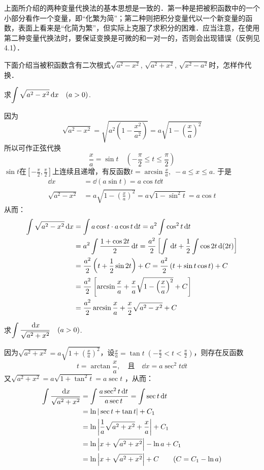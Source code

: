 上面所介绍的两种变量代换法的基本思想是一致的．第一种是把被积函数中的一个小部分看作一个变量，即“化繁为简”；第二种则把积分变量代以一个新变量的函数，表面上看来是“化简为繁”，但实际上克服了求积分的困难．应当注意，在使用第二种变量代换法时，要保证变换是可微的和一对一的，否则会出现错误（反例见4.1）．

下面介绍当被积函数含有二次根式$\sqrt{a^2-x^2}$, $\sqrt{a^2+x^2}$, $\sqrt{x^2-a^2}$时，怎样作代换．

\begin{example}
    求$\displaystyle\int \sqrt{a^2-x^2}\,{\rm d} x\quad (a>0)$.
\end{example}

\begin{solution}
因为\[\sqrt{a^2-x^2}=\sqrt{a^2\left(1-\frac{x^2}{a^2}\right)}=a\sqrt{1-\left(\frac{x}{a}\right)^2}\]
所以可作正弦代换
\[\frac{x}{a}=\sin t\quad \left(-\frac{\pi}{2}\le t\le \frac{\pi}{2}\right)\]
$\sin t$在$\left[-\frac{\pi}{2},\frac{\pi}{2}\right]$上连续且递增，有反函数$t=\arcsin\frac{x}{a},\; -a\le x\le a$. 于是
\[\begin{split}
    \dd x&=\dd (a\sin t)=a\cos t\dd t\\
    \sqrt{a^2-x^2}&=a\sqrt{1-\left(\frac{x}{a}\right)^2}=a\sqrt{1-\sin^2 t}=a\cos t
\end{split}\]
从而：
\[\begin{split}
    \displaystyle\int \sqrt{a^2-x^2}\,{\rm d} x&=\int a\cos t\cdot a\cos t\,{\rm d} t=a^2\int \cos^2 t\,{\rm d} t\\ 
&=a^2\int \dfrac{1+\cos 2t}{2}\,{\rm d} t=\dfrac{a^2}{2}\left[\int \,{\rm d} t+\dfrac{1}{2}\int \cos 2t\,{\rm d} (2t)\right]\\
&=\dfrac{a^2}{2}\left(t+\dfrac{1}{2}\sin 2t\right)+C=\dfrac{a^2}{2}\left(t+\sin t\cos t\right)+C\\
&=\dfrac{a^2}{2}\left[\arcsin\dfrac{x}{a}+\dfrac{x}{a}\sqrt{1-\left(\dfrac{x}{a}\right)^2}+C\right]\\
&=\dfrac{a^2}{2}\arcsin\dfrac{x}{a}+\dfrac{x}{2}\sqrt{a^2-x^2}+C
\end{split}\]
\end{solution}

\begin{example}
    求$\displaystyle\int \dfrac{\,{\rm d} x}{\sqrt{a^2+x^2}}\quad (a>0)$.
\end{example}

\begin{solution}
因为$\sqrt{a^2+x^2}=a\sqrt{1+\left(\frac{x}{a}\right)^2}$，设$\frac{x}{a}=\tan t\; \left(-\frac{\pi}{2}<t<\frac{\pi}{2}\right)$，则存在反函数
\[t=\arctan\frac{x}{a},\quad \text{且}\quad \dd x=a\sec^2 t\dd t\]
又$\sqrt{a^2+x^2}=a\sqrt{1+\tan^2 t}=a\sec t$
，从而：
\[\begin{split}
    \displaystyle\int \dfrac{\,{\rm d} x}{\sqrt{a^2+x^2}}&=\int\dfrac{a\sec^2 t\,{\rm d} t}{a\sec t}=\int\sec t\,{\rm d} t\\
    &=\ln|\sec t+\tan t|+C_1\\
    &=\ln\left|\dfrac{1}{a}\sqrt{a^2+x^2}+\dfrac{x}{a}\right|+C_1\\
    &=\ln\left|x+\sqrt{a^2+x^2}\right|-\ln a+C_1\\
    &=\ln\left|x+\sqrt{a^2+x^2}\right|+C\qquad (C=C_1-\ln a)
\end{split}\]
\end{solution}


